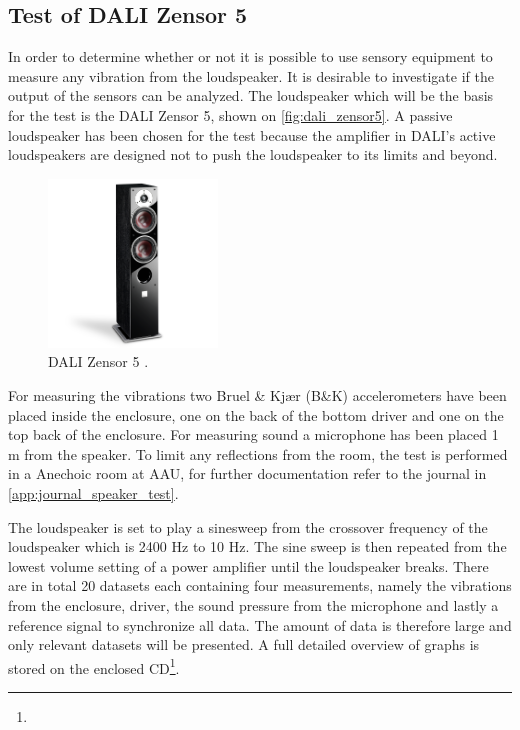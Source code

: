 \subsection*{Test of DALI Zensor 5}
In order to determine whether or not it is possible to use sensory equipment to measure any vibration from the loudspeaker. It is desirable to investigate if the output of the sensors can be analyzed. The loudspeaker which will be the basis for the test is the DALI Zensor 5, shown on \autoref{fig:dali_zensor5}. A passive loudspeaker has been chosen for the test because the amplifier in DALI's active loudspeakers are designed not to push the loudspeaker to its limits and beyond. %

\begin{figure}[H]
\centering
\includegraphics[width=0.4\textwidth]{figures/zensor5.png}
\caption{DALI Zensor 5 \citep{sou:daliZensor5}.}
\label{fig:dali_zensor5}
\end{figure}
\vspace{-4mm}

For measuring the vibrations two Bruel \& Kjær (B\&K) accelerometers have been placed inside the enclosure, one on the back of the bottom driver and one on the top back of the enclosure. For measuring sound a microphone has been placed 1 m from the speaker. To limit any reflections from the room, the test is performed in a Anechoic room at \gls{AAU}, for further documentation refer to the journal in \autoref{app:journal_speaker_test}.  



The loudspeaker is set to play a sinesweep from the crossover frequency of the loudspeaker which is 2400 Hz to 10 Hz. The sine sweep is then repeated from the lowest volume setting of a power amplifier until the loudspeaker breaks. There are in total 20 datasets each containing four measurements, namely the vibrations from the enclosure, driver, the sound pressure from the microphone and lastly a reference signal to synchronize all data. The amount of data is therefore large and only relevant datasets will be presented.  A full detailed overview of graphs is stored on the enclosed CD\footnote{}.



